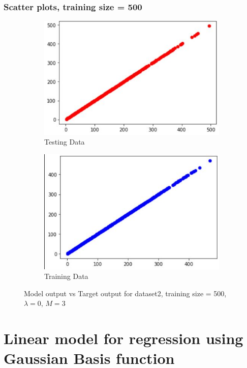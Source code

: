 \documentclass[11pt]{article}
\begin{document}
\subsubsection{Scatter plots, training size = 500}
\begin{figure}[h]
\centering
	\begin{subfigure}[b]{0.4\textwidth}
	\centering
	\includegraphics[scale=0.5]{dataset2_500_lambda0_test.jpg}
	\caption{Testing Data}
	\label{fig:fig2.1.6.1}
	\end{subfigure}
	\hfill
	\begin{subfigure}[b]{0.4\textwidth}
	\centering
	\includegraphics[scale=0.5]{dataset2_500_lambda0_train.jpg}
	\caption{Training Data}
	\label{fig:fig2.1.6.2}
	\end{subfigure}
\caption{Model output vs Target output for dataset2, training size = 500, $\lambda = 0$, $M =3 $}
\label{fig:fig2.1.6}
\end{figure}

\newpage
\section{Linear model for regression using Gaussian Basis function}
\end{document}
